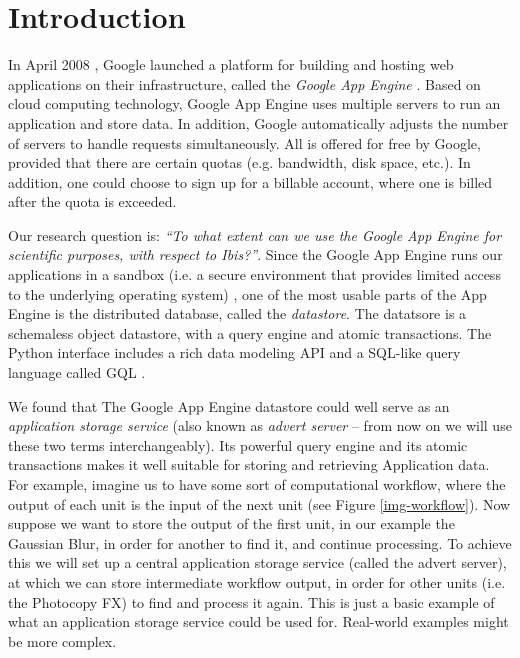 \section{Introduction}
\label{introduction}
In April 2008 \cite{app-engine-intro}, Google launched a platform for building
and hosting web applications on their infrastructure, called the \emph{Google App
Engine} \cite{app-engine-www}. Based on cloud computing technology, Google App
Engine uses multiple servers to run an application and store data. In addition,
Google automatically adjusts the number of servers to handle requests
simultaneously. All is offered for free by Google, provided that there are
certain quotas (e.g. bandwidth, disk space, etc.). In addition, one could
choose to sign up for a billable account, where one is billed after the quota
is exceeded.

Our research question is: \emph{``To what extent can we use the Google App Engine
for scientific purposes, with respect to Ibis?''}. Since the Google App Engine
runs our applications in a sandbox (i.e. a secure environment that provides
limited access to the underlying operating system) \cite{app-engine-sandbox}, one
of the most usable parts of the App Engine is the distributed database, called
the \emph{datastore}. The datatsore is a schemaless object datastore, with a
query engine and atomic transactions. The Python interface includes a rich data
modeling API and a SQL-like query language called GQL
\cite{app-engine-datastore}.

We found that The Google App Engine datastore could well serve as an
\emph{application storage service} (also known as \emph{advert server} -- from
now on we will use these two terms interchangeably). Its powerful query engine
and its atomic transactions makes it well suitable for storing and retrieving
Application data. For example, imagine us to have some sort of computational
workflow, where the output of each unit is the input of the next unit (see Figure
\ref{img-workflow}). Now suppose we want to store the output of the first unit,
in our example the Gaussian Blur, in order for another to find it, and continue
processing. To achieve this we will set up a central application storage service
(called the advert server), at which we can store intermediate workflow output,
in order for other units (i.e. the Photocopy FX) to find and process it again.
This is just a basic example of what an application storage service could be used
for. Real-world examples might be more complex.

